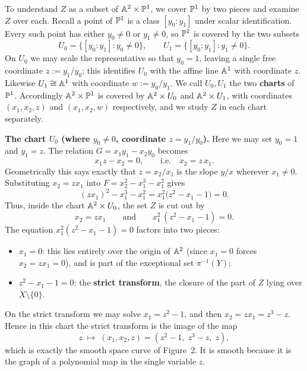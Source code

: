 \documentclass[12pt]{amsproc}
\begin{document}
    To understand $Z$ as a subset of $\A^2 \times \P^1$, we cover $\P^1$ by 
    two pieces and examine $Z$ over each. Recall a point of $\P^1$ is a class 
    $[y_0 : y_1]$ under scalar identification. Every such point has either 
    $y_0 \neq 0$ or $y_1 \neq 0$, so $\P^1$ is covered by the two subsets
    \[U_0 = \{[y_0 : y_1] : y_0 \neq 0\}, \qquad 
    U_1 = \{[y_0 : y_1] : y_1 \neq 0\}.\]
    On $U_0$ we may scale the representative so that $y_0 = 1$, leaving a single 
    free coordinate $z := y_1/y_0$; this identifies $U_0$ with the affine line 
    $\A^1$ with coordinate $z$. Likewise $U_1 \cong \A^1$ with coordinate 
    $w := y_0/y_1$. We call $U_0, U_1$ the two \textbf{charts} of $\P^1$. 
    Accordingly $\A^2 \times \P^1$ is covered by $\A^2 \times U_0$ and 
    $\A^2 \times U_1$, with coordinates $(x_1, x_2, z)$ and $(x_1, x_2, w)$ 
    respectively, and we study $Z$ in each chart separately.

    \medskip
    \noindent\textbf{The chart $U_0$ (where $y_0 \neq 0$, coordinate $z = y_1/y_0$).}
    Here we may set $y_0 = 1$ and $y_1 = z$. The relation $G = x_1 y_1 - x_2 y_0$ 
    becomes
    \[x_1 z - x_2 = 0, \qquad \text{i.e.} \quad x_2 = z\, x_1.\]
    Geometrically this says exactly that $z = x_2/x_1$ is the slope $y/x$ wherever 
    $x_1 \neq 0$. Substituting $x_2 = z x_1$ into $F = x_2^2 - x_1^3 - x_1^2$ gives
    \[(z x_1)^2 - x_1^3 - x_1^2 = x_1^2\big(z^2 - x_1 - 1\big) = 0.\]
    Thus, inside the chart $\A^2 \times U_0$, the set $Z$ is cut out by
    \[x_2 = z x_1 \qquad \text{and} \qquad x_1^2\,(z^2 - x_1 - 1) = 0.\]
    The equation $x_1^2(z^2 - x_1 - 1) = 0$ factors into two pieces:
    \begin{itemize}
        \item $x_1 = 0$: this lies entirely over the origin of $\A^2$ 
        (since $x_1 = 0$ forces $x_2 = z x_1 = 0$), and is part of the 
        exceptional set $\pi^{-1}(Y)$;
        \item $z^2 - x_1 - 1 = 0$: the \textbf{strict transform}, the closure of 
        the part of $Z$ lying over $X \setminus \{0\}$.
    \end{itemize}
    On the strict transform we may solve $x_1 = z^2 - 1$, and then 
    $x_2 = z x_1 = z^3 - z$. Hence in this chart the strict transform is the 
    image of the map
    \[z \;\longmapsto\; (x_1, x_2, z) = (z^2 - 1,\; z^3 - z,\; z),\]
    which is exactly the smooth space curve of Figure~2. It is smooth because it 
    is the graph of a polynomial map in the single variable $z$.
\end{document}
